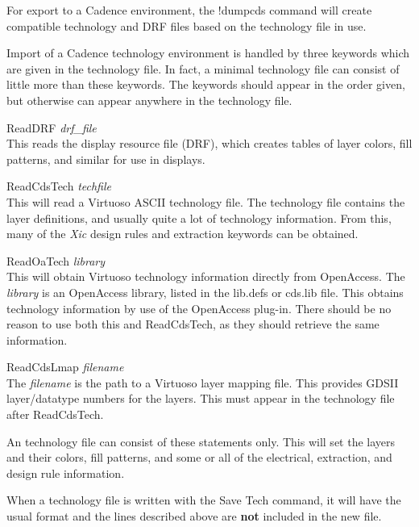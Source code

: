 For export to a Cadence environment, the {\cb !dumpcds} command will
create compatible technology and DRF files based on the {\Xic}
technology file in use.

Import of a Cadence technology environment is handled by three
keywords which are given in the {\Xic} technology file.  In fact, a
minimal technology file can consist of little more than these
keywords.  The keywords should appear in the order given, but
otherwise can appear anywhere in the {\Xic} technology file.

\begin{description}
\item{\vt ReadDRF} {\it drf\_file}\\
This reads the display resource file (DRF), which creates tables
of layer colors, fill patterns, and similar for use in displays.

\item{\vt ReadCdsTech} {\it techfile}\\
This will read a Virtuoso ASCII technology file.  The technology file
contains the layer definitions, and usually quite a lot of technology
information.  From this, many of the {\it Xic} design rules and
extraction keywords can be obtained.

\ifoa
\item{\vt ReadOaTech} {\it library}\\
This will obtain Virtuoso technology information directly from
OpenAccess.  The {\it library} is an OpenAccess library, listed in
the {\vt lib.defs} or {\vt cds.lib} file.  This obtains technology
information by use of the OpenAccess plug-in.  There should be no
reason to use both this and {\vt ReadCdsTech}, as they should
retrieve the same information.
\fi

\item{\vt ReadCdsLmap} {\it filename}\\
The {\it filename} is the path to a Virtuoso layer mapping file.  This
provides GDSII layer/datatype numbers for the layers.  This must
appear in the {\Xic} technology file after {\vt ReadCdsTech}.
\end{description}

An {\Xic} technology file can consist of these statements only.  This
will set the layers and their colors, fill patterns, and some or all
of the electrical, extraction, and design rule information.

When a technology file is written with the {\cb Save Tech} command, it
will have the usual format and the lines described above are {\bf not}
included in the new file.

